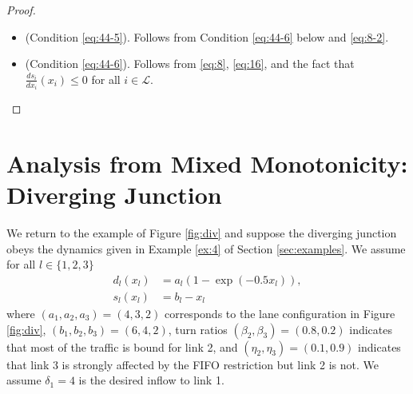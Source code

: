 \documentclass[letterpaper, 10 pt, conference]{ieeeconf}
\newcommand{\Links}{\mathcal{L}}
\begin{document}
\begin{proof}
\begin{itemize}[leftmargin=*]
    \item    (Condition \ref{eq:44-5}). Follows from Condition \ref{eq:44-6} below and \eqref{eq:8-2}. 
    \item    (Condition \ref{eq:44-6}).  Follows from \eqref{eq:8}, \eqref{eq:16}, and the fact that $\frac{d s_i}{d x_i}(x_i)\leq 0$ for all $i\in\Links$.
\end{itemize}
\end{proof}





\section{Analysis from Mixed Monotonicity: Diverging Junction}
\label{sec:example}














We return to the example of Figure \ref{fig:div} and suppose the diverging junction obeys the dynamics given in Example \ref{ex:4} of Section \ref{sec:examples}. We assume for all $l\in\{1,2,3\}$
\begin{align}
  \label{eq:7}
  d_l(x_l)&=a_l(1-\exp(-0.5x_l)),\\
  \label{eq:7-2} s_l(x_l)&=b_l-x_l
\end{align}
where $(a_1,a_2,a_3)=(4,3,2)$ corresponds to the lane configuration in Figure \ref{fig:div}, $(b_1,b_2,b_3)=(6,4,2)$, turn ratios $(\beta_{2},\beta_3)=(0.8,0.2)$ indicates that most of the traffic is bound for link 2, and $(\eta_2,\eta_3)=(0.1,0.9)$ indicates that link 3 is strongly affected by the FIFO restriction but link 2 is not. We assume $\delta_1=4$ is the desired inflow to link 1. 
\end{document}
